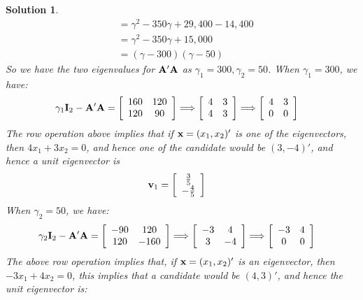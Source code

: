 \documentclass[11pt]{article}
\newtheorem{sol}{Solution}
\begin{document}
\begin{sol}
\begin{align*}
	 	&= \gamma^2 - 350\gamma + 29,400 - 14,400\\
	 	&= \gamma^2 - 350\gamma + 15,000\\
	 	&= (\gamma - 300)(\gamma - 50)
	 \end{align*}
	 So we have the two eigenvalues for ${\bf A}'{\bf A}$ as $\gamma_1 = 300, \gamma_2 = 50$.\vskip 2mm
	 When $\gamma_1 = 300$, we have:
	 \begin{align*}
	 	\gamma_1{\bf I}_2  - {\bf A}'{\bf A} &= \left[\begin{array}{cc} 160&120 \\120 &90 \end{array}\right] \Longrightarrow \left[\begin{array}{cc} 4&3 \\ 4& 3\end{array}\right]\Longrightarrow \left[\begin{array}{cc} 4& 3\\ 0&0 \end{array}\right]
	 \end{align*}
	 The row operation above implies that if ${\bf x} = (x_1, x_2)'$ is one of the eigenvectors, then $4x_1 + 3x_2 = 0$, and hence one of the candidate would be $(3, -4)'$, and hence a unit eigenvector is
	 \begin{align*}
	 	{\bf v}_1 &= \left[\begin{array}{c} \frac{3}{5}\\ -\frac{4}{5}\end{array}\right]
	 \end{align*}
	 When $\gamma_2 = 50$, we have:
	 \begin{align*}
	 	\gamma_2 {\bf I}_2 - {\bf A}'{\bf A} &= \left[\begin{array}{cc} -90&120 \\ 120&-160 \end{array}\right] \Longrightarrow \left[\begin{array}{cc} -3&4 \\ 3& -4\end{array}\right]\Longrightarrow \left[\begin{array}{cc} -3&4 \\0 &0 \end{array}\right]
	 \end{align*}
	 The above row operation implies that, if ${\bf x} = (x_1, x_2)'$ is an eigenvector, then $-3x_1 + 4x_2 = 0$, this implies that a candidate would be $(4, 3)'$, and hence the unit eigenvector is:
	 \begin{align*}

\end{align*}
\end{sol}
\end{document}
